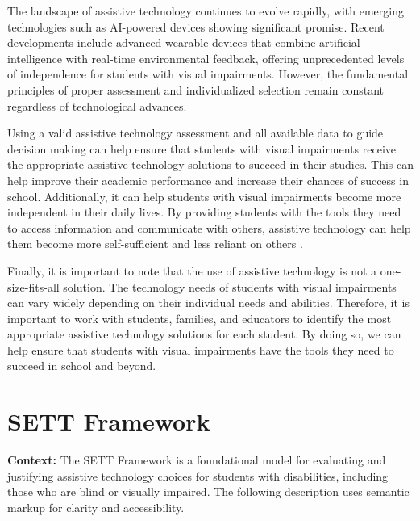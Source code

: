 The landscape of assistive technology continues to evolve rapidly, with emerging technologies such as AI-powered devices showing significant promise. Recent developments include advanced wearable devices that combine artificial intelligence with real-time environmental feedback, offering unprecedented levels of independence for students with visual impairments. However, the fundamental principles of proper assessment and individualized selection remain constant regardless of technological advances.

Using a valid assistive technology assessment and all available data to guide decision making can help ensure that students with visual impairments receive the appropriate assistive technology solutions to succeed in their studies. This can help improve their academic performance and increase their chances of success in school. Additionally, it can help students with visual impairments become more independent in their daily lives. By providing students with the tools they need to access information and communicate with others, assistive technology can help them become more self-sufficient and less reliant on others \supercite{WATI2010}.

Finally, it is important to note that the use of assistive technology is not a one-size-fits-all solution. The technology needs of students with visual impairments can vary widely depending on their individual needs and abilities. Therefore, it is important to work with students, families, and educators to identify the most appropriate assistive technology solutions for each student. By doing so, we can help ensure that students with visual impairments have the tools they need to succeed in school and beyond.

\section{SETT Framework}\label{app3:trouble41}

\noindent
\textbf{Context:} The SETT Framework is a foundational model for evaluating and justifying assistive technology choices for students with disabilities, including those who are blind or visually impaired. The following description uses semantic markup for clarity and accessibility.

